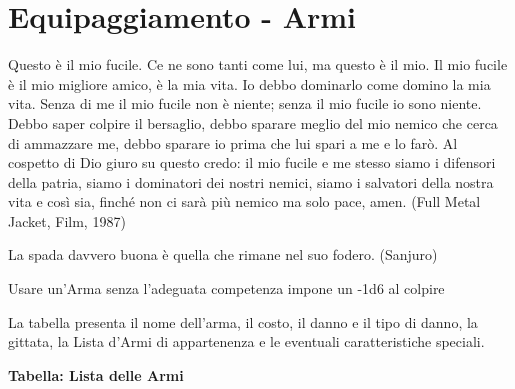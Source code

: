 \section{Equipaggiamento - Armi}\label{equipaggiamentoarmi}\hypertarget{equipaggiamentoarmi}{}
\hypertarget{equipaggiamento.armi}{}

\label{equipaggiamento---armi}
\begin{enfasi}{
Questo è il mio fucile. Ce ne sono tanti come lui, ma questo è il mio. Il mio fucile è il mio migliore amico, è la mia vita. Io debbo dominarlo come domino la mia vita. Senza di me il mio fucile non è niente; senza il mio fucile io sono niente. Debbo saper colpire il bersaglio, debbo sparare meglio del mio nemico che cerca di ammazzare me, debbo sparare io prima che lui spari a me e lo farò. Al cospetto di Dio giuro su questo credo: il mio fucile e me stesso siamo i difensori della patria, siamo i dominatori dei nostri nemici, siamo i salvatori della nostra vita e così sia, finché non ci sarà più nemico ma solo pace, amen. (Full Metal Jacket, Film, 1987)

\medskip

La spada davvero buona è quella che rimane nel suo fodero. (Sanjuro)}\end{enfasi}

\medskip

Usare un'Arma senza l'adeguata competenza impone un -1d6 al colpire

La tabella presenta il nome dell'arma, il costo, il danno e il tipo di danno, la gittata, la Lista d'Armi di appartenenza e le eventuali caratteristiche speciali.

\medskip

\textbf{Tabella: Lista delle Armi}

